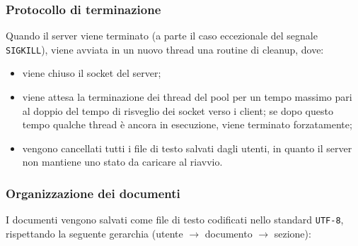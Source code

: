 \subsubsection{Protocollo di terminazione}
\sloppy
Quando il server viene terminato (a parte il caso eccezionale del segnale \texttt{SIGKILL}), viene avviata in un nuovo thread una routine di cleanup, dove:
\begin{itemize}
	\item viene chiuso il socket del server;
	\item viene attesa la terminazione dei thread del pool per un tempo massimo pari al doppio del tempo di risveglio dei socket verso i client; se dopo questo tempo qualche thread è ancora in esecuzione, viene terminato forzatamente;
	\item vengono cancellati tutti i file di testo salvati dagli utenti, in quanto il server non mantiene uno stato da caricare al riavvio.
\end{itemize}

\subsubsection{Organizzazione dei documenti}
I documenti vengono salvati come file di testo codificati nello standard \texttt{UTF-8}, rispettando la seguente gerarchia (utente $\rightarrow$ documento $\rightarrow$ sezione):

\medskip

